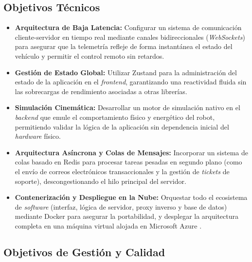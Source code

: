 \subsection{Objetivos Técnicos}

\begin{itemize}
    \item \textbf{Arquitectura de Baja Latencia:} Configurar un sistema de comunicación cliente-servidor en tiempo real mediante canales bidireccionales (\textit{WebSockets}) para asegurar que la telemetría refleje de forma instantánea el estado del vehículo y permitir el control remoto sin retardos.
    \item \textbf{Gestión de Estado Global:} Utilizar Zustand \cite{zustand} para la administración del estado de la aplicación en el \textit{frontend}, garantizando una reactividad fluida sin las sobrecargas de rendimiento asociadas a otras librerías.
    \item \textbf{Simulación Cinemática:} Desarrollar un motor de simulación nativo en el \textit{backend} que emule el comportamiento físico y energético del robot, permitiendo validar la lógica de la aplicación sin dependencia inicial del \textit{hardware} físico.
    \item \textbf{Arquitectura Asíncrona y Colas de Mensajes:} Incorporar un sistema de colas basado en Redis \cite{redis} para procesar tareas pesadas en segundo plano (como el envío de correos electrónicos transaccionales y la gestión de \textit{tickets} de soporte), descongestionando el hilo principal del servidor.
    \item \textbf{Contenerización y Despliegue en la Nube:} Orquestar todo el ecosistema de \textit{software} (interfaz, lógica de servidor, proxy inverso y base de datos) mediante Docker \cite{docker} para asegurar la portabilidad, y desplegar la arquitectura completa en una máquina virtual alojada en Microsoft Azure \cite{azure}.
\end{itemize}

\subsection{Objetivos de Gestión y Calidad}

